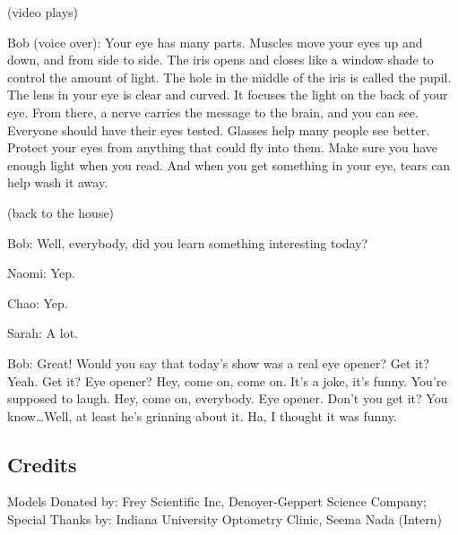 (video plays)

Bob (voice over): Your eye has many parts. Muscles move your eyes up and down, and from side to side. The iris opens and closes like a window shade to control the amount of light. The hole in the middle of the iris is called the pupil. The lens in your eye is clear and curved. It focuses the light on the back of your eye. From there, a nerve carries the message to the brain, and you can see. Everyone should have their eyes tested. Glasses help many people see better. Protect your eyes from anything that could fly into them. Make sure you have enough light when you read. And when you get something in your eye, tears can help wash it away.

(back to the house)

Bob: Well, everybody, did you learn something interesting today?

Naomi: Yep.

Chao: Yep.

Sarah: A lot.

Bob: Great! Would you say that today's show was a real eye opener? Get it? Yeah. Get it? Eye opener? Hey, come on, come on. It's a joke, it's funny. You're supposed to laugh. Hey, come on, everybody. Eye opener. Don't you get it? You know\dots Well, at least he's grinning about it. Ha, I thought it was funny.

\subsection{Credits}

Models Donated by: Frey Scientific Inc, Denoyer-Geppert Science Company;
Special Thanks by: Indiana University Optometry Clinic, Seema Nada (Intern)
